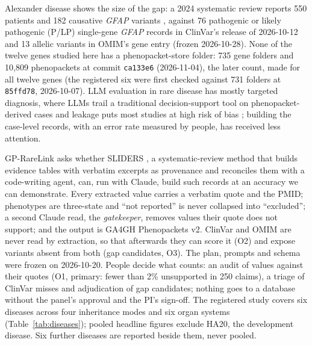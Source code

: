 \documentclass{article} %
\begin{document}
Alexander disease shows the size of the gap: a 2024 systematic review reports 550 patients and 182 causative \emph{GFAP} variants \citep{grossi2024_axd_meta}, against 76 pathogenic or likely pathogenic (P/LP) single-gene \emph{GFAP} records in ClinVar's release of 2026-10-12 and 13 allelic variants in OMIM's gene entry (frozen 2026-10-28). None of the twelve genes studied here has a phenopacket-store folder: 735 gene folders and 10,809 phenopackets at commit \texttt{ca133e6} (2026-11-04), the later count, made for all twelve genes (the registered six were first checked against 731 folders at \texttt{85ffd78}, 2026-10-07). LLM evaluation in rare disease has mostly targeted diagnosis, where LLMs trail a traditional decision-support tool on phenopacket-derived cases \citep{reese2026_llm_vs_exomiser} and leakage puts most studies at high risk of bias \citep{nguyen2026_llm_rd_metaanalysis}; building the case-level records, with an error rate measured by people, has received less attention.

GP-RareLink asks whether SLIDERS \citep{joshi2026_sliders}, a systematic-review method that builds evidence tables with verbatim excerpts as provenance and reconciles them with a code-writing agent, can, run with Claude, build such records at an accuracy we can demonstrate. Every extracted value carries a verbatim quote and the PMID; phenotypes are three-state and ``not reported'' is never collapsed into ``excluded''; a second Claude read, the \emph{gatekeeper}, removes values their quote does not support; and the output is GA4GH Phenopackets v2. ClinVar and OMIM are never read by extraction, so that afterwards they can score it (O2) and expose variants absent from both (gap candidates, O3). The plan, prompts and schema were frozen on 2026-10-20. People decide what counts: an audit of values against their quotes (O1, primary: fewer than 2\% unsupported in 250 claims), a triage of ClinVar misses and adjudication of gap candidates; nothing goes to a database without the panel's approval and the PI's sign-off. The registered study covers six diseases across four inheritance modes and six organ systems (Table~\ref{tab:diseases}); pooled headline figures exclude HA20, the development disease. Six further diseases are reported beside them, never pooled.
\end{document}
